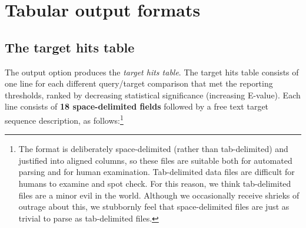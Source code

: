 \section{Tabular output formats}
\label{section:tabular}
\setcounter{footnote}{0}

\subsection{The target hits table}

The  output option produces the \emph{target hits
  table}.  The target hits table consists of one line for each
different query/target comparison that met the reporting thresholds,
ranked by decreasing statistical significance (increasing E-value).
Each line consists of \textbf{18 space-delimited fields} followed by a
free text target sequence description, as follows:\footnote{The
   format is deliberately space-delimited (rather than
  tab-delimited) and justified into aligned columns, so these files
  are suitable both for automated parsing and for human
  examination. Tab-delimited data files are difficult for humans to
  examine and spot check. For this reason, we think tab-delimited
  files are a minor evil in the world. Although we occasionally
  receive shrieks of outrage about this, we stubbornly feel that
  space-delimited files are just as trivial to parse as tab-delimited
  files.}

